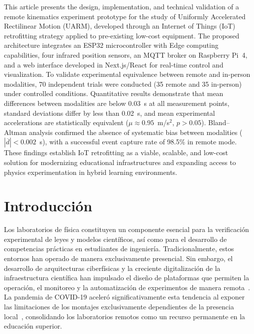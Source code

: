 \documentclass{espol-rte}
\begin{document}
\begin{abstractespol}
This article presents the design, implementation, and technical validation of a remote kinematics experiment prototype for the study of Uniformly Accelerated Rectilinear Motion (UARM), developed through an Internet of Things (IoT) retrofitting strategy applied to pre-existing low-cost equipment. The proposed architecture integrates an ESP32 microcontroller with Edge computing capabilities, four infrared position sensors, an MQTT broker on Raspberry Pi~4, and a web interface developed in Next.js/React for real-time control and visualization. To validate experimental equivalence between remote and in-person modalities, 70 independent trials were conducted (35 remote and 35 in-person) under controlled conditions. Quantitative results demonstrate that mean differences between modalities are below 0.03~s at all measurement points, standard deviations differ by less than 0.02~s, and mean experimental accelerations are statistically equivalent ($\mu \approx 0.95$~m/s$^2$, $p > 0.05$). Bland--Altman analysis confirmed the absence of systematic bias between modalities ($|\overline{d}| < 0.002$~s), with a successful event capture rate of 98.5\% in remote mode. These findings establish IoT retrofitting as a viable, scalable, and low-cost solution for modernizing educational infrastructures and expanding access to physics experimentation in hybrid learning environments.
\end{abstractespol}

\section{Introducci\'on}
\vspace{-0.15cm}

Los laboratorios de f\'isica constituyen un componente esencial para la verificaci\'on experimental de leyes y modelos cient\'ificos, as\'i como para el desarrollo de competencias pr\'acticas en estudiantes de ingenier\'ia. Tradicionalmente, estos entornos han operado de manera exclusivamente presencial. Sin embargo, el desarrollo de arquitecturas ciberf\'isicas y la creciente digitalizaci\'on de la infraestructura cient\'ifica han impulsado el dise\~no de plataformas que permiten la operaci\'on, el monitoreo y la automatizaci\'on de experimentos de manera remota~\parencite{r1}. La pandemia de COVID-19 aceler\'o significativamente esta tendencia al exponer las limitaciones de los montajes exclusivamente dependientes de la presencia local~\parencite{r2}, consolidando los laboratorios remotos como un recurso permanente en la educaci\'on superior.
\end{document}
